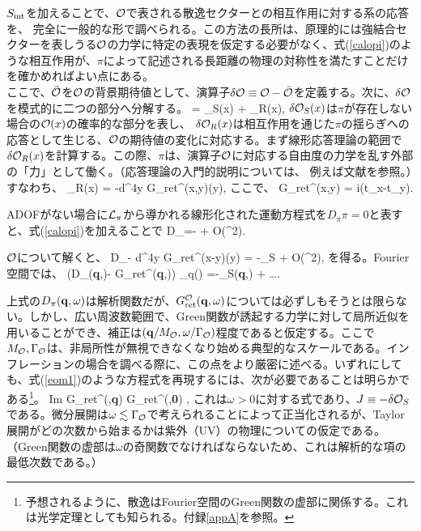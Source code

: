 $S_{\rm int}$を加えることで、${\cal O}$で表される散逸セクターとの相互作用に対する系の応答を、
完全に一般的な形で調べられる。この方法の長所は、原理的には強結合セクターを表しうる${\cal O}$の力学に特定の表現を仮定する必要がなく、式(\ref{calopi})のような相互作用が、$\pi$によって記述される長距離の物理の対称性を満たすことだけを確かめればよい点にある\cite{dis1,dis2}。\\
 
ここで、$\bar{{\cal O}}$を${\cal O}$の背景期待値として、演算子$\delta{\cal O}\equiv {\cal O}-\bar{{\cal O}}$を定義する。次に、$\delta{\cal O}$を模式的に二つの部分へ分解する。
\beq
\delta\calo = \delta\calo_S(x) + \delta\calo_R(x),
\eeq
$\delta{\cal O}_S(x)$は$\pi$が存在しない場合の${\cal O}(x)$の確率的な部分を表し、
$\delta{\cal O}_R(x)$は相互作用を通じた$\pi$の揺らぎへの応答として生じる、${\cal O}$の期待値の変化に対応する。まず線形応答理論の範囲で$\delta{\cal O}_R(x)$を計算する。この際、$\pi$は、演算子${\cal O}$に対応する自由度の力学を乱す外部の「力」として働く。（応答理論の入門的説明については、
例えば文献\cite{Fetter}を参照。）すなわち、
\beq
\label{dret0}
\delta\calo_R(x) =  -\int d^4y G_{\rm ret}^\calo(x,y)\pi(y),
\eeq
ここで、
\beq
\label{dret}
G_{\rm ret}^\calo(x,y) = i\rangle \theta(t_x-t_y).
\eeq

ADOFがない場合に$\cal L_\pi$から導かれる線形化された運動方程式を$D_\pi \pi=0$と表すと、式(\ref{calopi})を加えることで
\beq
D_\pi \pi =- \calo  + O(\pi^2).
\eeq

${\cal O}$について解くと、
\beq
\label{dpig}
D_\pi \pi -  \int d^4y G_{\rm ret}^\calo(x-y)\pi(y) = -\delta\calo_S + O(\pi^2),
\eeq
を得る。Fourier空間では、
\beq
\left(D_\pi({\bf q},\omega)- G_{\rm ret}^\calo({\bf q},\omega)\right) \pi_q(\omega) =-\delta\calo_S({\bf q},\omega) + \ldots.
\eeq

上式の$D_\pi({\bf q},\omega)$は解析関数だが、$G_{\rm ret}^{\cal O}({\bf q},\omega)$については必ずしもそうとは限らない。しかし、広い周波数範囲で、Green関数が誘起する力学に対して局所近似を用いることができ、補正は$({\bf q}/M_{\cal O}, \omega/\Gamma_{\cal O})$程度であると仮定する。ここで$M_{\cal O},\Gamma_{\cal O}$は、非局所性が無視できなくなり始める典型的なスケールである。インフレーションの場合を調べる際に、この点をより厳密に述べる。いずれにしても、式(\ref{eom1})のような方程式を再現するには、次が必要であることは明らかである\footnote{予想されるように、散逸はFourier空間のGreen関数の虚部に関係する。これは光学定理としても知られる。付録\ref{appA}を参照。}。
\beq
\label{expG}
{\rm Im} G_{\rm ret}^\calo (\omega,{\bf q})  G_{\rm ret}^\calo (\omega,{\bf 0}) \simeq  \gamma \omega,
\eeq
これは$\omega>0$に対する式であり、$J \equiv -\delta{\cal O}_S$である。微分展開は$\omega\lesssim \Gamma_{\cal O}$で考えられることによって正当化されるが、Taylor展開がどの次数から始まるかは紫外（UV）の物理についての仮定である。（Green関数の虚部は$\omega$の奇関数でなければならないため、これは解析的な項の最低次数である。）

